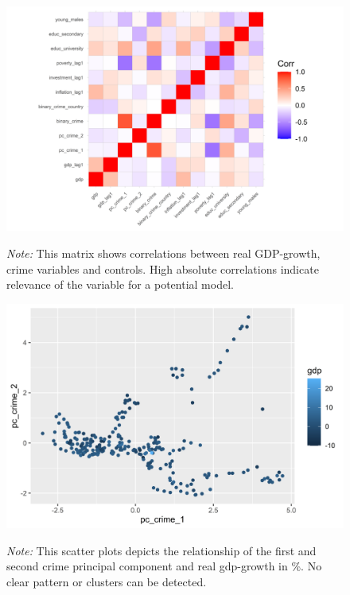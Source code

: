 \documentclass[a4paper,12pt]{article}
\begin{document}
\begin{figure}[!h]
\begin{minipage}{0.9\textwidth}
  \includegraphics[trim={0 0 0 0},width=\linewidth]{charts/corr_matrix_paper.png}
\begin{flushleft}
\footnotesize{\textit{Note:} This matrix shows correlations between real GDP-growth, crime variables and controls. High absolute correlations indicate relevance of the variable for a potential model.
\label{fig:corr_matrix_paper}	
}
\end{flushleft}
\end{minipage}
\end{figure}

\begin{figure}[!h]
\begin{minipage}{0.9\textwidth}
  \includegraphics[trim={0 0 0 0},width=\linewidth]{charts/scatter_pca.png}
\begin{flushleft}
\footnotesize{\textit{Note:} This scatter plots depicts the relationship of the first and second crime principal component and real gdp-growth in \%. No clear pattern or clusters can be detected.
\label{fig:scatter_pca}	
}
\end{flushleft}
\end{minipage}
\end{figure}
\end{document}
